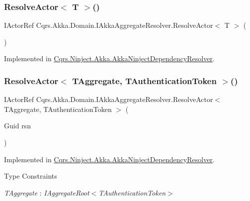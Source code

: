 \subsubsection{\texorpdfstring{Resolve\+Actor$<$ T $>$()}{ResolveActor< T >()}}
{\footnotesize\ttfamily I\+Actor\+Ref Cqrs.\+Akka.\+Domain.\+I\+Akka\+Aggregate\+Resolver.\+Resolve\+Actor$<$ T $>$ (\begin{DoxyParamCaption}{ }\end{DoxyParamCaption})}



Implemented in \hyperlink{classCqrs_1_1Ninject_1_1Akka_1_1AkkaNinjectDependencyResolver_a6c3399c949a77457456d77688eb66054_a6c3399c949a77457456d77688eb66054}{Cqrs.\+Ninject.\+Akka.\+Akka\+Ninject\+Dependency\+Resolver}.

\mbox{\label{interfaceCqrs_1_1Akka_1_1Domain_1_1IAkkaAggregateResolver_a59dbc788ce9893d72684ff5c18945c1d_a59dbc788ce9893d72684ff5c18945c1d}} 
\subsubsection{\texorpdfstring{Resolve\+Actor$<$ T\+Aggregate, T\+Authentication\+Token $>$()}{ResolveActor< TAggregate, TAuthenticationToken >()}}
{\footnotesize\ttfamily I\+Actor\+Ref Cqrs.\+Akka.\+Domain.\+I\+Akka\+Aggregate\+Resolver.\+Resolve\+Actor$<$ T\+Aggregate, T\+Authentication\+Token $>$ (\begin{DoxyParamCaption}\item[{Guid}]{rsn }\end{DoxyParamCaption})}



Implemented in \hyperlink{classCqrs_1_1Ninject_1_1Akka_1_1AkkaNinjectDependencyResolver_ab5ba20875aab8764bbb7d6df61722436_ab5ba20875aab8764bbb7d6df61722436}{Cqrs.\+Ninject.\+Akka.\+Akka\+Ninject\+Dependency\+Resolver}.

\begin{Desc}
\item[Type Constraints]\begin{description}
\item[{\em T\+Aggregate} : {\em I\+Aggregate\+Root$<$T\+Authentication\+Token$>$}]\end{description}
\end{Desc}
